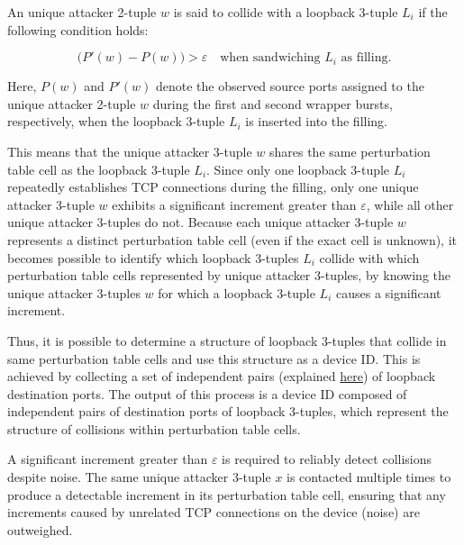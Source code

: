 \documentclass[twocolumn]{report}
\begin{document}
An \alert{unique attacker 2-tuple \(w\)} is said to collide with a \alert{loopback 3-tuple \(L_i\)} if the following \alert{condition} holds:

\begin{minipage}{\columnwidth}
\begin{equation*}
	\bigl(P'(w) - P(w)\bigr) > \varepsilon
	\quad \text{when sandwiching } L_i \text{ as filling.}
\end{equation*}
\end{minipage}

Here, \(P(w)\) and \(P'(w)\) denote the observed \alert{source ports assigned to} the \alert{unique attacker 2-tuple \(w\)} during the first and second wrapper bursts, respectively, when the loopback 3-tuple \(L_i\) is inserted into the filling.

This means that the unique attacker 3-tuple \(w\) shares the same perturbation table cell as the loopback 3-tuple \(L_i\). Since \alert{only one} loopback 3-tuple \(L_i\) repeatedly establishes TCP connections during the filling, only one unique attacker 3-tuple \(w\) exhibits a \alert{significant increment} greater than \(\varepsilon\), while all other unique attacker 3-tuples do not. Because each unique attacker 3-tuple \(w\) represents a distinct perturbation table cell (even if the exact cell is unknown), it becomes possible to identify which loopback 3-tuples \(L_i\) collide with which perturbation table cells represented by unique attacker 3-tuples, by knowing the unique attacker 3-tuples \(w\) for which a loopback 3-tuple \(L_i\) causes a significant increment.

Thus, it is possible to determine a \alert{structure} of loopback 3-tuples that collide in same perturbation table cells and use this structure as a \alert{device ID}. This is achieved by collecting a set of \alert{independent pairs} (explained \hyperlink{independant}{here}) of loopback destination ports. The \alert{output} of this process is a device ID composed of independent pairs of destination ports of loopback 3-tuples, which represent the structure of collisions within perturbation table cells.

A significant increment greater than \(\varepsilon\) is required to reliably detect collisions despite \alert{noise}. The same unique attacker 3-tuple \(x\) is contacted \alert{multiple times} to produce a detectable increment in its perturbation table cell, ensuring that any increments caused by unrelated TCP connections on the device (noise) are outweighed.
\end{document}
